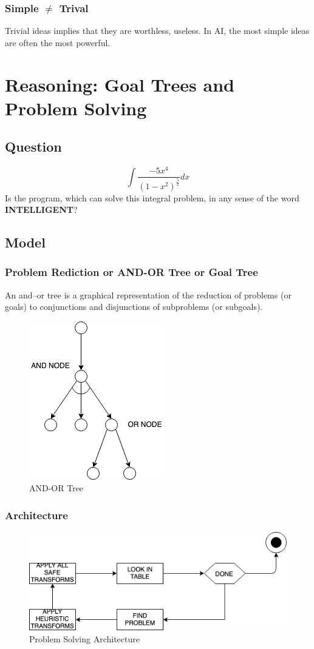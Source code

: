 \documentclass[12pt]{book}
\begin{document}
\subsubsection{Simple $\neq$ Trival}
\indent Trivial ideas implies that they are worthless, useless. In AI, the most simple ideas are often the most powerful.
\newpage

\section{Reasoning: Goal Trees and Problem Solving} 
\subsection{Question}
$$\int\frac{-5x^4}{(1-x^2)^{\frac{5}{2}}}dx$$
\indent Is the program, which can solve this 
integral problem, in any sense of the word \textbf{INTELLIGENT}?
\subsection{Model}
\subsubsection{Problem Rediction or AND-OR Tree or Goal Tree}
An and–or tree is a graphical representation of the reduction of problems (or goals) to conjunctions and disjunctions of subproblems (or subgoals).
\begin{figure}[ht]
	\centering
	\includegraphics[scale=0.6]{Figure/Figure2_1.png}
	\caption{AND-OR Tree}
\end{figure}
\subsubsection{Architecture}
\begin{figure}[ht]
	\centering
	\includegraphics[scale=0.7]{Figure/Figure2_2.png}
	\caption{Problem Solving Architecture}
\end{figure}
\end{document}
